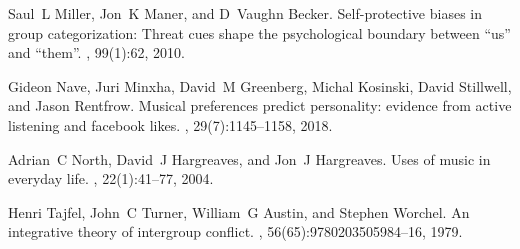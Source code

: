 \documentclass{article}
\begin{document}
\begin{thebibliography}{10}
Saul~L Miller, Jon~K Maner, and D~Vaughn Becker.
\newblock Self-protective biases in group categorization: Threat cues shape the
  psychological boundary between ``us'' and ``them''.
, 99(1):62, 2010.

Gideon Nave, Juri Minxha, David~M Greenberg, Michal Kosinski, David Stillwell,
  and Jason Rentfrow.
\newblock Musical preferences predict personality: evidence from active
  listening and facebook likes.
, 29(7):1145--1158, 2018.

Adrian~C North, David~J Hargreaves, and Jon~J Hargreaves.
\newblock Uses of music in everyday life.
, 22(1):41--77, 2004.

Henri Tajfel, John~C Turner, William~G Austin, and Stephen Worchel.
\newblock An integrative theory of intergroup conflict.
, 56(65):9780203505984--16,
  1979.

\end{thebibliography}
\end{document}
